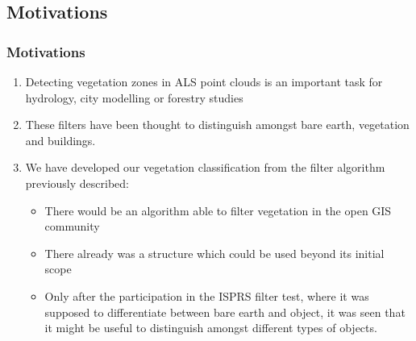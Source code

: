 \subsection{Motivations}
\begin{frame}
    \frametitle{Motivations}
    \begin{enumerate}
     \item Detecting vegetation zones in ALS point clouds is an important task for \alert{hydrology}, \alert{city modelling} or \alert{forestry studies}
    \item These filters have been thought to distinguish amongst bare earth, vegetation and buildings.
    \item We have developed our vegetation classification from the filter algorithm previously described:
      \begin{itemize}
	\item There would be an algorithm able to filter vegetation in the open GIS community
	\item There already was a structure which could be used beyond its initial scope
	\item Only after the participation in the ISPRS filter test, where it was supposed to differentiate between bare earth and object, it was seen that it might be useful to distinguish amongst different types of objects.
      \end{itemize}
    \end{enumerate}
\end{frame}
